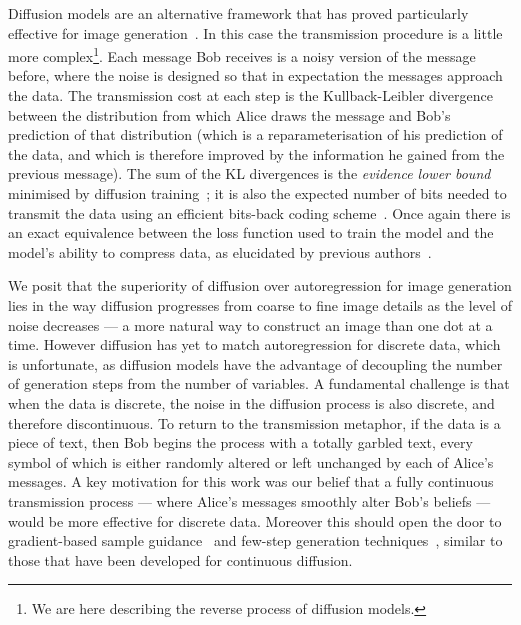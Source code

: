 \documentclass[11pt,table]{article}
\newcommand{\0}[1]{\constvec{0}{#1}}
\newcommand{\1}[1]{\constvec{1}{#1}}
\begin{document}
Diffusion models are an alternative framework that has proved particularly effective for image generation~\cite{dhariwal2021diffusion,rombach2022high}.
In this case the transmission procedure is a little more complex\footnote{We are here describing the reverse process of diffusion models.}.
Each message Bob receives is a noisy version of the message before, where the noise is designed so that in expectation the messages approach the data.
The transmission cost at each step is the Kullback-Leibler divergence between the distribution from which Alice draws the message and Bob's prediction of that distribution (which is a reparameterisation of his prediction of the data, and which is therefore improved by the information he gained from the previous message).
The sum of the KL divergences is the \emph{evidence lower bound} minimised by diffusion training~\citep{sohl2015deep}; it is also the expected number of bits needed to transmit the data using an efficient bits-back coding scheme~\citep{Wallace1991ClassificationBM,hinton1993keeping}. 
Once again there is an exact equivalence between the loss function used to train the model and the model’s ability to compress data, as elucidated by previous authors~\citep{townsend2019practical}.

We posit that the superiority of diffusion over autoregression for image generation lies in the way diffusion progresses from coarse to fine image details as the level of noise decreases --- a more natural way to construct an image than one dot at a time.
However diffusion has yet to match autoregression for discrete data, which is unfortunate, as diffusion models have the advantage of decoupling the number of generation steps from the number of variables.
A fundamental challenge is that when the data is discrete, the noise in the diffusion process is also discrete, and therefore discontinuous.
To return to the transmission metaphor, if the data is a piece of text, then Bob begins the process with a totally garbled text, every symbol of which is either randomly altered or left unchanged by each of Alice's messages.
A key motivation for this work was our belief that a fully continuous transmission process --- where Alice's messages smoothly alter Bob's beliefs --- would be more effective for discrete data.
Moreover this should open the door to gradient-based sample guidance~\citep{dhariwal2021diffusion} and few-step generation techniques~\citep{salimans2022progressive,watson2022learning,song2023consistency}, similar to those that have been developed for continuous diffusion.
\end{document}
